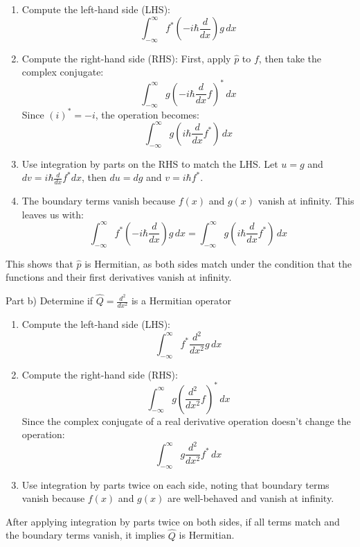 \begin{enumerate}
    \item Compute the left-hand side (LHS):
    \[ \int_{-\infty}^{\infty} f^{*}(-i\hbar\frac{d}{dx})g \, dx \]
    
    \item Compute the right-hand side (RHS):
    First, apply \( \hat{p} \) to \( f \), then take the complex conjugate:
    \[ \int_{-\infty}^{\infty} g(-i\hbar\frac{d}{dx}f)^{*} \, dx \]
    Since \( (i)^{*} = -i \), the operation becomes:
    \[ \int_{-\infty}^{\infty} g(i\hbar\frac{d}{dx}f^{*}) \, dx \]
    
    \item Use integration by parts on the RHS to match the LHS. Let \( u = g \) and \( dv = i\hbar\frac{d}{dx}f^{*}dx \), then \( du = dg \) and \( v = i\hbar f^{*} \).
    
    \item The boundary terms vanish because \( f(x) \) and \( g(x) \) vanish at infinity. This leaves us with:
    \[ \int_{-\infty}^{\infty} f^{*}(-i\hbar\frac{d}{dx})g \, dx = \int_{-\infty}^{\infty} g(i\hbar\frac{d}{dx}f^{*}) \, dx \]
\end{enumerate}

This shows that \( \hat{p} \) is Hermitian, as both sides match under the condition that the functions and their first derivatives vanish at infinity.

Part b) Determine if \( \hat{Q} = \frac{d^{2}}{dx^{2}} \) is a Hermitian operator

\begin{enumerate}
    \item Compute the left-hand side (LHS):
    \[ \int_{-\infty}^{\infty} f^{*}\frac{d^{2}}{dx^{2}}g \, dx \]
    
    \item Compute the right-hand side (RHS):
    \[ \int_{-\infty}^{\infty} g(\frac{d^{2}}{dx^{2}}f)^{*} \, dx \]
    Since the complex conjugate of a real derivative operation doesn't change the operation:
    \[ \int_{-\infty}^{\infty} g\frac{d^{2}}{dx^{2}}f^{*} \, dx \]
    
    \item Use integration by parts twice on each side, noting that boundary terms vanish because \( f(x) \) and \( g(x) \) are well-behaved and vanish at infinity.
\end{enumerate}

After applying integration by parts twice on both sides, if all terms match and the boundary terms vanish, it implies \( \hat{Q} \) is Hermitian.

